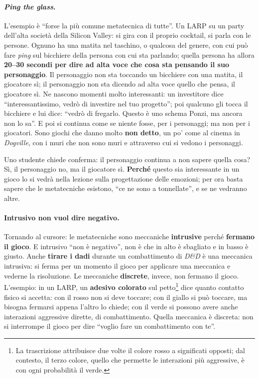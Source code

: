 \paragraph{\emph{Ping the glass}.} L'esempio è ``forse la più comune metatecnica
di tutte''. Un LARP su un party dell'alta società della Silicon Valley: si gira
con il proprio cocktail, si parla con le persone. Ognuno ha una matita nel
taschino, o qualcosa del genere, con cui può fare \emph{ping} sul bicchiere della
persona con cui sta parlando; quella persona ha allora \textbf{20--30 secondi per
dire ad alta voce che cosa sta pensando il suo personaggio}. Il personaggio non
sta toccando un bicchiere con una matita, il giocatore sì; il personaggio non sta
dicendo ad alta voce quello che pensa, il giocatore sì. Ne nascono momenti molto
interessanti: un investitore dice ``interessantissimo, vedrò di investire nel tuo
progetto''; poi qualcuno gli tocca il bicchiere e lui dice: ``vedrò di fregarlo.
Questo è uno schema Ponzi, ma ancora non lo sa''. E poi si continua come se
niente fosse, per i personaggi; ma non per i giocatori. Sono giochi che danno
molto \textbf{non detto}, un po' come al cinema in \emph{Dogville}, con i muri
che non sono muri e attraverso cui si vedono i personaggi.

Uno studente chiede conferma: il personaggio continua a non sapere quella cosa?
Sì, il personaggio no, ma il giocatore sì. \textbf{Perché} questo sia
interessante in un gioco lo si vedrà nella lezione sulla progettazione delle
emozioni; per ora basta sapere che le metatecniche esistono, ``ce ne sono a
tonnellate'', e se ne vedranno altre.

\paragraph{Intrusivo non vuol dire negativo.} Tornando al cursore: le
metatecniche sono meccaniche \textbf{intrusive} perché \textbf{fermano il gioco}.
E intrusivo ``non è negativo'', non è che in alto è sbagliato e in basso è
giusto. Anche \textbf{tirare i dadi} durante un combattimento di \emph{D\&D} è
una meccanica intrusiva: si ferma per un momento il gioco per applicare una
meccanica e vederne la risoluzione. Le meccaniche \textbf{discrete}, invece, non
fermano il gioco. L'esempio: in un LARP, un \textbf{adesivo colorato} sul
petto\footnote{La trascrizione attribuisce due volte il colore rosso a
significati opposti; dal contesto, il terzo colore, quello che permette le
interazioni più aggressive, è con ogni probabilità il verde.} dice quanto
contatto fisico si accetta: con il rosso non si deve toccare; con il giallo si
può toccare, ma bisogna fermarsi appena l'altro lo chiede; con il verde si
possono avere anche interazioni aggressive dirette, di combattimento. Quella
meccanica è discreta: non si interrompe il gioco per dire ``voglio fare un
combattimento con te''.

